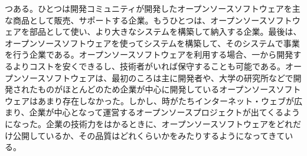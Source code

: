 \documentclass[uplatex,twocolumn,dvipdfmx]{jsarticle}
\begin{document}
つある。ひとつは開発コミュニティが開発したオープンソースソフトウェアを主な商品として販売、サポートする企業。もうひとつは、オープンソースソフトウェアを部品として使い、より大きなシステムを構築して納入する企業。最後は、オープンソースソフトウェアを使ってシステムを構築して、そのシステムで事業を行う企業である。オープンソースソフトウェアを利用する場合、一から開発するよりコストを安くできるし、技術者がいれば保守することも可能である。オープンソースソフトウェアは、最初のころは主に開発者や、大学の研究所などで開発されたものがほとんどのため企業が中心に開発しているオープンソースソフトウェアはあまり存在しなかった。しかし、時がたちインターネット・ウェブが広まり、企業が中心となって運営するオープンソースプロジェクトが出てくるようになった。企業の技術力をはかるときに、オープンソースソフトウェアをどれだけ公開しているか、その品質はどれくらいかをみたりするようになってきている。

\end{document}
